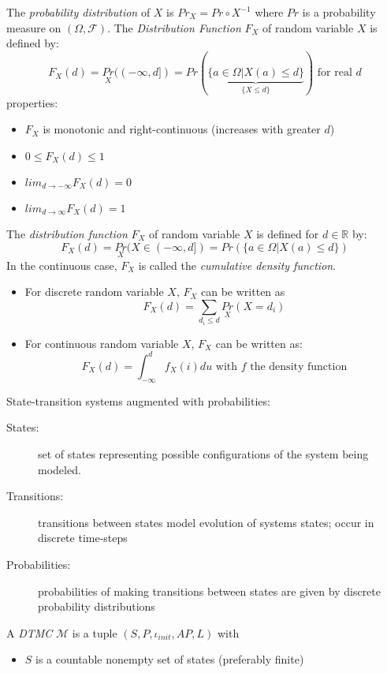 \documentclass[a4paper, 10pt]{article}
\newcommand{\underbraceset}[2]{\underset{#1}{\underbrace{#2}}}
\begin{document}
\begin{mdframed}
The \emph{probability distribution} of $X$ is $Pr_X=Pr\circ X^{-1}$ where $Pr$ is a probability measure on $(\Omega,\mathcal{F})$.
The \emph{Distribution Function} $F_X$ of random variable $X$ is defined by:
\[
F_X(d) = \underset{X}{Pr}((-\infty,d]) = Pr(\underbraceset{\{X\leq d\}}{\{a\in\Omega|X(a)\leq d\}}) \text{ for real }d
\]
properties:
\begin{itemize}
    \item $F_X$ is monotonic and right-continuous (increases with greater $d$)
    \item $0\leq F_X(d)\leq1$
    \item $lim_{d\to-\infty}F_X(d)=0$
    \item $lim_{d\to\infty}F_X(d)=1$
\end{itemize}
The \emph{distribution function} $F_X$ of random variable $X$ is defined for $d\in\mathds{R}$ by:
\[
F_X(d)=\underset{X}{Pr}(X\in(-\infty,d]) = Pr(\{a\in\Omega|X(a)\leq d\})
\]
In the continuous case, $F_X$ is called the \emph{cumulative density function}.
\begin{itemize}
    \item For discrete random variable $X$, $F_X$ can be written as
    \[
    F_X(d)=\sum_{d_i\leq d}\underset{X}{Pr}(X=d_i)
    \]
    \item For continuous random variable $X$, $F_X$ can be written as:
    \[
    F_X(d)=\int_{-\infty}^d f_X(i) du \text{ with $f$ the density function}
    \]
\end{itemize}
State-transition systems augmented with probabilities:
\begin{description}
    \item[States:] set of states representing possible configurations of the system being modeled.
    \item[Transitions:] transitions between states model evolution of systems states; occur in discrete time-steps
    \item[Probabilities:] probabilities of making transitions between states are given by discrete probability distributions
\end{description}
A \emph{DTMC} $\mathcal{M}$ is a tuple $(S,P,\iota_{init},AP,L)$ with
\begin{itemize}
    \item $S$ is a countable nonempty set of states (preferably finite)

\end{itemize}
\end{mdframed}
\end{document}
